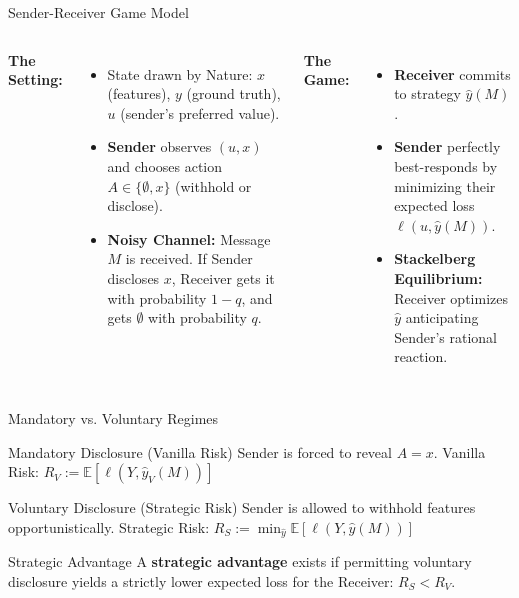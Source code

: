 \documentclass[10pt, aspectratio=169]{beamer}
\newcommand{\E}{\mathbb{E}}
\begin{document}
\begin{frame}{Sender-Receiver Game Model}
    \begin{columns}[T]
    \textbf{The Setting:}
    \begin{itemize}
        \item State drawn by Nature: $x$ (features), $y$ (ground truth), $u$ (sender's preferred value).
        \item \textbf{Sender} observes $(u, x)$ and chooses action $A \in \{\emptyset, x\}$ (withhold or disclose).
        \item \textbf{Noisy Channel:} Message $M$ is received. If Sender discloses $x$, Receiver gets it with probability $1-q$, and gets $\emptyset$ with probability $q$.
    \end{itemize}

    \textbf{The Game:}
    \begin{itemize}
        \item \textbf{Receiver} commits to strategy $\hat{y}(M)$.
        \item \textbf{Sender} perfectly best-responds by minimizing their expected loss $\ell(u, \hat{y}(M))$.
        \item \textbf{Stackelberg Equilibrium:} Receiver optimizes $\hat{y}$ anticipating Sender's rational reaction.
    \end{itemize}
    \end{columns}
\end{frame}

\begin{frame}{Mandatory vs. Voluntary Regimes}
    \begin{block}{Mandatory Disclosure (Vanilla Risk)}
      Sender is forced to reveal $A = x$.
      Vanilla Risk: $R_V := \E[\ell(Y, \hat{y}_V(M))]$
    \end{block}

    \begin{block}{Voluntary Disclosure (Strategic Risk)}
      Sender is allowed to withhold features opportunistically.
      Strategic Risk: $R_S := \min_{\hat{y}} \E[\ell(Y, \hat{y}(M))]$
    \end{block}
    
    \vspace{0.2cm}
    \begin{alertblock}{Strategic Advantage}
      A \textbf{strategic advantage} exists if permitting voluntary disclosure yields a strictly lower expected loss for the Receiver: \quad $R_S < R_V$.
    \end{alertblock}
\end{frame}
\end{document}
